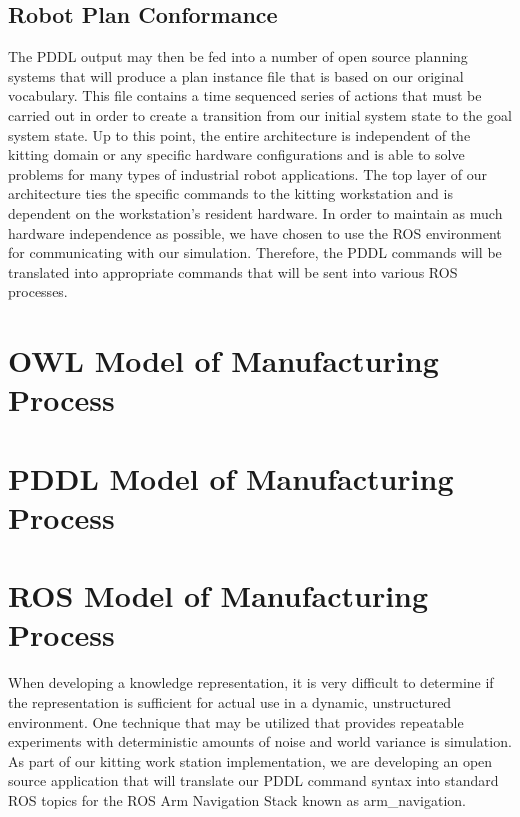 \documentclass[a4paper, 10pt, conference]{ieeeconf}      %
\begin{document}
\subsection{Robot Plan Conformance}
The PDDL output may then be fed into a number of open source planning systems that will produce a plan instance file that is based on our original vocabulary. This file
contains a time sequenced series of actions that must be carried out in order to create a transition from our initial system state to the goal system state. Up to this point,
the entire architecture is independent of the kitting domain or any specific hardware configurations and is able to solve problems for many types of industrial robot applications.
The top layer of our architecture ties the specific commands to the kitting workstation and is dependent on the workstation's resident hardware.  In order to maintain as
much hardware independence as possible, we have chosen to use the ROS environment for communicating with our simulation. Therefore, the PDDL commands will
be translated into appropriate commands that will be sent into various ROS processes.

\section{OWL Model of Manufacturing Process}
\label{sect:OWL_Layer}







\section{PDDL Model of Manufacturing Process}
\label{sect:PDDL_Layer}


\section{ROS Model of Manufacturing Process}
\label{sect:ROS}
When developing a knowledge representation, it is very difficult to determine if the representation is sufficient for actual use in a dynamic, unstructured environment.
One technique that may be utilized that provides repeatable experiments with deterministic amounts of noise and world variance is simulation. As part of our kitting work
station implementation, we are developing an open source application that will translate our PDDL command syntax into standard ROS topics for the ROS Arm Navigation
Stack known as arm\_navigation.
\end{document}
